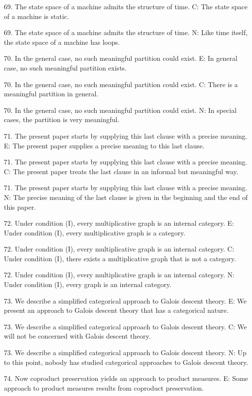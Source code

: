 69. The state space of a machine admits the structure of time.
C: The state space of a machine is static.

69. The state space of a machine admits the structure of time.
N: Like time itself, the state space of a machine has loops.

70. In the general case, no such meaningful partition could exist.
E: In general case, no such meaningful partition exists.

70. In the general case, no such meaningful partition could exist.
C: There is a meaningful partition in general.

70. In the general case, no such meaningful partition could exist.
N: In special cases, the partition is very meaningful.

71. The present paper starts by supplying this last clause with a precise meaning.
E: The present paper supplies a precise meaning to this last clause.

71. The present paper starts by supplying this last clause with a precise meaning.
C: The present paper treats the last clause in an informal but meaningful way.

71. The present paper starts by supplying this last clause with a precise meaning.
N: The precise meaning of the last clause is given in the beginning and the end of this paper.

72. Under condition (I), every multiplicative graph is an internal category.
E: Under condition (I), every multiplicative graph is a category.

72. Under condition (I), every multiplicative graph is an internal category.
C: Under condition (I), there exists a multiplicative graph that is not a category.

72. Under condition (I), every multiplicative graph is an internal category.
N: Under condition (I), every graph is an internal category.

73. We describe a simplified categorical approach to Galois descent theory.
E: We present an approach to Galois descent theory that has a categorical nature.

73. We describe a simplified categorical approach to Galois descent theory.
C: We will not be concerned with Galois descent theory.

73. We describe a simplified categorical approach to Galois descent theory.
N: Up to this point, nobody has studied categorical approaches to Galois descent theory.

74. Now coproduct preservation yields an approach to product measures.
E: Some approach to product measures results from coproduct preservation.

